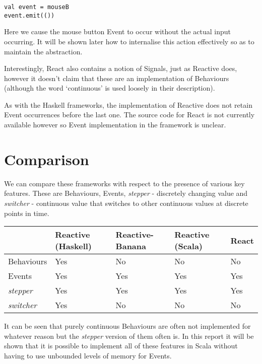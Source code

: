 \begin{verbatim}
val event = mouseB
event.emit(())
\end{verbatim}      

      Here we cause the mouse button Event to occur without the actual input occurring. It will be shown later how to     
      internalise this action effectively so as to maintain the abstraction. 

      Interestingly, React also contains a notion of Signals, just as Reactive does, 
      however it doesn't claim that these are an implementation of Behaviours (although the word `continuous' is
      used loosely in their description). 
      
      As with the Haskell frameworks, the implementation of Reactive does not retain Event occurrences before the
      last one. The source code for React is not currently available however so Event implementation in the framework is  
      unclear.
      
\section{Comparison}
  We can compare these frameworks with respect to the presence of various key features. These are Behaviours, Events, 
  \emph{stepper} - discretely 
  changing value and \emph{switcher} - continuous value that switches to other continuous values at discrete points in time.
  
  \begin{center}
     \begin{tabular}{ | l | l | l | l | l | }
       \hline
        & Reactive (Haskell) & Reactive-Banana & Reactive (Scala) & React \\ \hline \hline
       Behaviours & Yes & No & No & No \\ \hline
       Events & Yes & Yes & Yes & Yes \\ \hline
       \emph{stepper} & Yes & Yes & Yes & Yes \\ \hline
       \emph{switcher} & Yes & No & No & No \\ \hline  
     \end{tabular}
   \end{center}
   
   It can be seen that purely continuous Behaviours are often not implemented for whatever reason
   but the \emph{stepper} version
   of them often is. In this report it will
   be shown that it is possible to implement all of these features in Scala without having to use unbounded levels
   of memory for Events.